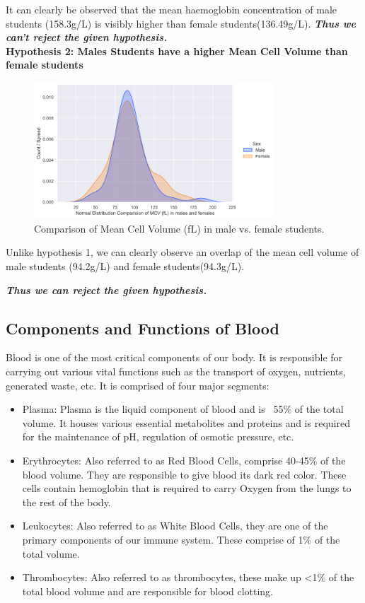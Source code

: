 \documentclass[pdflatex,sn-mathphys]{sn-jnl}%
\theoremstyle{thmstyleone}%
\theoremstyle{thmstyletwo}%
\theoremstyle{thmstylethree}%
\begin{document}
It can clearly be observed that the mean haemoglobin concentration of male students (158.3g/L) is visibly higher than female students(136.49g/L). \textbf{\textit{Thus we can't reject the given hypothesis.}}
\\

\noindent\textbf{Hypothesis 2: Males Students have a higher Mean Cell Volume than female students}
\begin{figure}[h!]
    \centering
    \includegraphics[width=0.8\textwidth]{photos/hyp_2.png}
    \caption{Comparison of Mean Cell Volume (fL) in male vs. female students. }\label{fig1}
\end{figure}

Unlike hypothesis 1, we can clearly observe an overlap of the mean cell volume of male students (94.2g/L) and female students(94.3g/L).

\textbf{\textit{Thus we can reject the given hypothesis.}}
\subsection{Components and Functions of Blood}
Blood is one of the most critical components of our body. It is responsible for carrying out various vital functions such as the transport of oxygen, nutrients, generated waste, etc. It is comprised of four major segments:
\begin{itemize}
    \item Plasma: Plasma is the liquid component of blood and is ~55\% of the total volume. It houses various essential metabolites and proteins and is required for the maintenance of pH, regulation of osmotic pressure, etc.
    \item Erythrocytes: Also referred to as Red Blood Cells, comprise 40-45\% of the blood volume. They are responsible to give blood its dark red color. These cells contain hemoglobin that is required to carry Oxygen from the lungs to the rest of the body.
    \item  Leukocytes: Also referred to as White Blood Cells, they are one of the primary components of our immune system. These comprise of 1\% of the total volume.
    \item Thrombocytes: Also referred to as thrombocytes, these make up <1\% of the total blood volume and are responsible for blood clotting.
\end{itemize}
\end{document}
